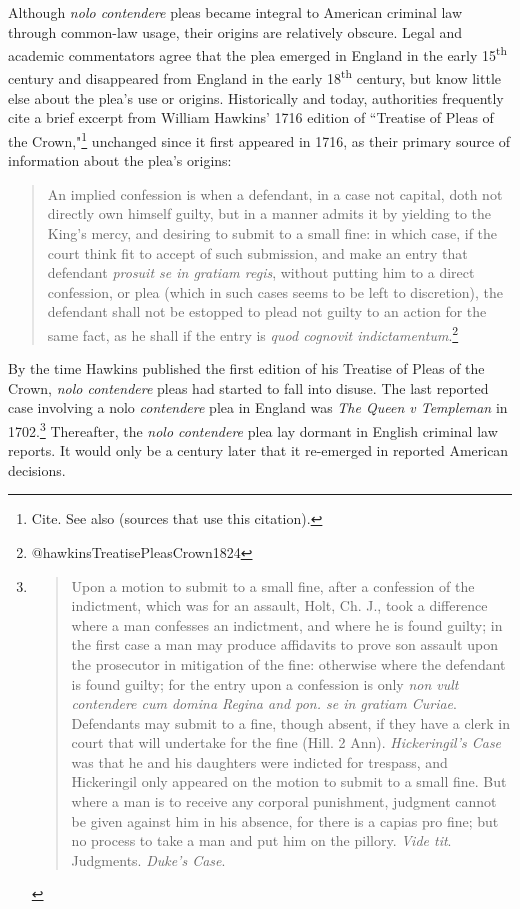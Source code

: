 Although \textit{nolo contendere} pleas became integral to American criminal law through common-law usage, their origins are relatively obscure. Legal and academic commentators agree that the plea emerged in England in the early 15\textsuperscript{th} century and disappeared from England in the early 18\textsuperscript{th} century, but know little else about the plea's use or origins. Historically and today, authorities frequently cite a brief excerpt from William Hawkins' 1716 edition of ``Treatise of Pleas of the Crown,"\footnote{Cite. See also (sources that use this citation).} unchanged since it first appeared in 1716, as their primary source of information about the plea's origins:

\begin{quote}
\singlespacing
An implied confession is when a defendant, in a case not capital, doth not directly own himself guilty, but in a manner admits it by yielding to the King's mercy, and desiring to submit to a small fine: in which case, if the court think fit to accept of such submission, and make an entry that defendant \textit{prosuit se in gratiam regis}, without putting him to a direct confession, or plea (which in such cases seems to be left to discretion), the defendant shall not be estopped to plead not guilty to an action for the same fact, as he shall if the entry is \textit{quod cognovit indictamentum}.\footnote{@hawkinsTreatisePleasCrown1824}
\end{quote}

By the time Hawkins published the first edition of his Treatise of Pleas of the Crown, \textit{nolo contendere} pleas had started to fall into disuse. The last reported case involving a nolo\textit{ contendere} plea in England was \textit{The Queen v Templeman} in 1702.\footnote{\begin{quote}
\singlespacing
Upon a motion to submit to a small fine, after a confession of the indictment, which was for an assault, Holt, Ch. J., took a difference where a man confesses an indictment, and where he is found guilty; in the first case a man may produce affidavits to prove son assault upon the prosecutor in mitigation of the fine: otherwise where the defendant is found guilty; for the entry upon a confession is only \textit{non vult contendere cum domina Regina and pon. se in gratiam Curiae}. Defendants may submit to a fine, though absent, if they have a clerk in court that will undertake for the fine (Hill. 2 Ann). \textit{Hickeringil's Case} was that he and his daughters were indicted for trespass, and Hickeringil only appeared on the motion to submit to a small fine. But where a man is to receive any corporal punishment, judgment cannot be given against him in his absence, for there is a capias pro fine; but no process to take a man and put him on the pillory. \textit{Vide tit}. Judgments. \textit{Duke's Case}.
\end{quote}} Thereafter, the \textit{nolo contendere} plea lay dormant in English criminal law reports. It would only be a century later that it re-emerged in reported American decisions.

